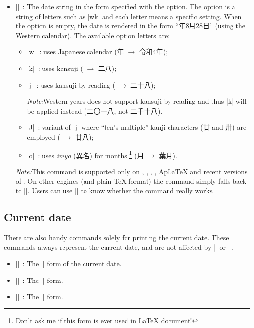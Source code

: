 \documentclass[a4paper]{article}
\newcommand{\Meta}[1]{$\langle$\textit{#1}$\rangle$}
\newcommand{\Note}{\par\noindent\emph{Note:}\quad}
\newcommand{\Means}{~:\quad}
\newcommand*{\Ja}[1]{{\fIpaex#1}}
\newcommand*{\+}{\hspace{0.25em minus 0.25em}}
\begin{document}
\begin{itemize}
\item |\warekicustomdate{|\Meta{option}|}|\Means
  The date string in the form specified with the option.
  The option is a string of letters such as |wk|
  and each letter means a specific setting.
  When the option is empty, the date is rendered in the form
  ``\Ja{2022\+年\+8\+月\+28\+日}'' (using the Western calendar).
  The available option letters are:
  \begin{itemize}
  \item |w|\Means
    uses Japanese calendar (\Ja{2022\+年} $\to$ \Ja{令和\+4\+年});
  \item |k|\Means
    uses kansuji (\Ja{28} $\to$ \Ja{二八});
  \item |j|\Means
    uses kansuji-by-reading (\Ja{28} $\to$ \Ja{二十八});
    \par\smallskip
    \Note Western years does not support kansuji-by-reading
    and thus |k| will be applied instead
    (\Ja{二〇一八}, not \Ja{二千十八}).
  \item |J|\Means
    variant of |j| where ``ten's multiple'' kanji characters
    (\Ja{廿} and \Ja{卅}) are employed (\Ja{28} $\to$ \Ja{廿八});
  \item |o|\Means
    uses \emph{imyo} (\Ja{異名}) for months%
    \footnote{Don't ask me if this form is ever used in {\LaTeX} document!}
    (\Ja{8\+月} $\to$ \Ja{葉月}).
  \end{itemize}

  \Note This command is supported only on {\pdfLaTeX}, {\XeLaTeX},
  {\LuaLaTeX}, {\upLaTeX}, {Ap\LaTeX} and recent versions of {\pLaTeX}.
  On other engines (and plain {\TeX} format)
  the command simply falls back to |\warekidate|.
  Users can use |\WarekiIfCustomDateAvailable| to know
  whether the command really works.
\end{itemize}

\subsection{Current date}

There are also handy commands solely for printing the current date.
These commands always represent the current date,
and are not affected by |\warekisetdate| or |\warekisettoday|.

\begin{itemize}
\item |\warekitoday|\Means
  The |\warekidate| form of the current date.
\item |\warekikanjitoday|\Means
  The |\warekikanjidate| form.
\item |\warekijkanjitoday|\Means
  The |\warekijkanjidate| form.
\end{itemize}
\end{document}
